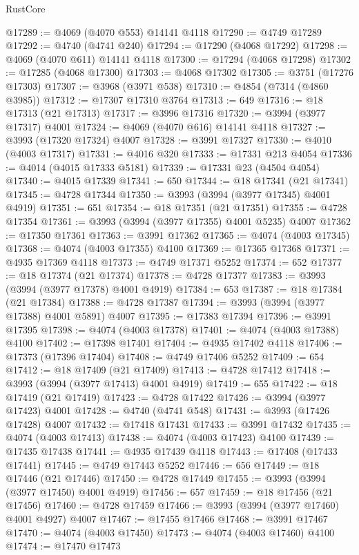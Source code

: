 \begin{lexlean}{RustCore}
\begin{coremodule}
@17289 := @4069 (@4070 @553) @14141 @4118
@17290 := @4749 @17289
@17292 := @4740 (@4741 @240)
@17294 := @17290 (@4068 @17292)
@17298 := @4069 (@4070 @611) @14141 @4118
@17300 := @17294 (@4068 @17298)
@17302 := @17285 (@4068 @17300)
@17303 := @4068 @17302
@17305 := @3751 (@17276 @17303)
@17307 := @3968 (@3971 @538)
@17310 := @4854 (@7314 (@4860 @3985))
@17312 := @17307 @17310 @3764
@17313 := 649
@17316 := @18 @17313 (@21 @17313)
@17317 := @3996 @17316
@17320 := @3994 (@3977 @17317) @4001
@17324 := @4069 (@4070 @616) @14141 @4118
@17327 := @3993 (@17320 @17324) @4007
@17328 := @3991 @17327
@17330 := @4010 (@4003 @17317)
@17331 := @4016 @320
@17333 := @17331 @213 @4054
@17336 := @4014 (@4015 @17333 @5181)
@17339 := @17331 @23 (@4504 @4054)
@17340 := @4015 @17339
@17341 := 650
@17344 := @18 @17341 (@21 @17341)
@17345 := @4728 @17344
@17350 := @3993 (@3994 (@3977 @17345) @4001 @4919)
@17351 := 651
@17354 := @18 @17351 (@21 @17351)
@17355 := @4728 @17354
@17361 := @3993 (@3994 (@3977 @17355) @4001 @5235) @4007
@17362 := @17350 @17361
@17363 := @3991 @17362
@17365 := @4074 (@4003 @17345)
@17368 := @4074 (@4003 @17355) @4100
@17369 := @17365 @17368
@17371 := @4935 @17369 @4118
@17373 := @4749 @17371 @5252
@17374 := 652
@17377 := @18 @17374 (@21 @17374)
@17378 := @4728 @17377
@17383 := @3993 (@3994 (@3977 @17378) @4001 @4919)
@17384 := 653
@17387 := @18 @17384 (@21 @17384)
@17388 := @4728 @17387
@17394 := @3993 (@3994 (@3977 @17388) @4001 @5891) @4007
@17395 := @17383 @17394
@17396 := @3991 @17395
@17398 := @4074 (@4003 @17378)
@17401 := @4074 (@4003 @17388) @4100
@17402 := @17398 @17401
@17404 := @4935 @17402 @4118
@17406 := @17373 (@17396 @17404)
@17408 := @4749 @17406 @5252
@17409 := 654
@17412 := @18 @17409 (@21 @17409)
@17413 := @4728 @17412
@17418 := @3993 (@3994 (@3977 @17413) @4001 @4919)
@17419 := 655
@17422 := @18 @17419 (@21 @17419)
@17423 := @4728 @17422
@17426 := @3994 (@3977 @17423) @4001
@17428 := @4740 (@4741 @548)
@17431 := @3993 (@17426 @17428) @4007
@17432 := @17418 @17431
@17433 := @3991 @17432
@17435 := @4074 (@4003 @17413)
@17438 := @4074 (@4003 @17423) @4100
@17439 := @17435 @17438
@17441 := @4935 @17439 @4118
@17443 := @17408 (@17433 @17441)
@17445 := @4749 @17443 @5252
@17446 := 656
@17449 := @18 @17446 (@21 @17446)
@17450 := @4728 @17449
@17455 := @3993 (@3994 (@3977 @17450) @4001 @4919)
@17456 := 657
@17459 := @18 @17456 (@21 @17456)
@17460 := @4728 @17459
@17466 := @3993 (@3994 (@3977 @17460) @4001 @4927) @4007
@17467 := @17455 @17466
@17468 := @3991 @17467
@17470 := @4074 (@4003 @17450)
@17473 := @4074 (@4003 @17460) @4100
@17474 := @17470 @17473

\end{coremodule}
\end{lexlean}
